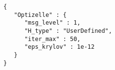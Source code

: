 \begin{lstlisting}[style=json,caption={Optizelle uses this input specification to minimize the Rosenbrock function in Listing \ref{lst:Rosen}.  We explain this specification Chapter \ref{ch:Input}.},label=lst:RosenJSON]
{
   "Optizelle" : {
      "msg_level" : 1,
      "H_type" : "UserDefined",
      "iter_max" : 50,
      "eps_krylov" : 1e-12
   }
}
\end{lstlisting}
